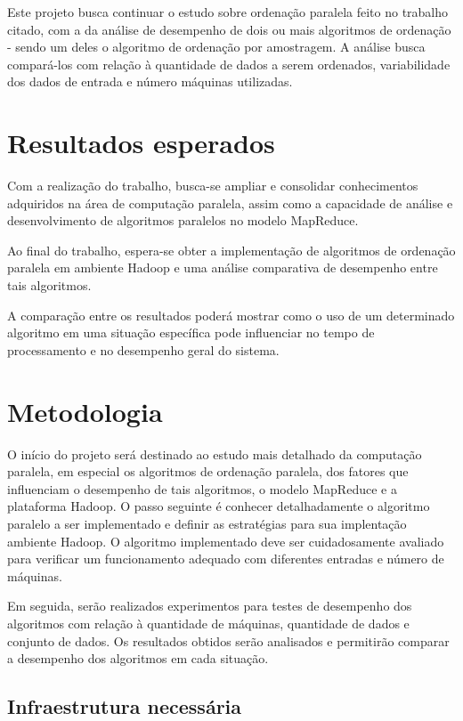 Este projeto busca continuar o estudo sobre ordenação paralela feito no trabalho citado, com a da análise de desempenho de dois ou mais algoritmos de ordenação - sendo um deles o algoritmo de ordenação por amostragem. A análise busca compará-los com relação à quantidade de dados a serem ordenados, variabilidade dos dados de entrada e número máquinas utilizadas. 

\chapter{Resultados esperados}

Com a realização do trabalho, busca-se ampliar e consolidar conhecimentos adquiridos na área de computação paralela, assim como
a capacidade de análise e desenvolvimento de algoritmos paralelos no modelo MapReduce. 


Ao final do trabalho, espera-se obter a implementação de algoritmos de ordenação paralela em ambiente Hadoop e uma análise comparativa de desempenho entre tais algoritmos.

A comparação entre os resultados poderá mostrar como o uso de um determinado algoritmo em uma situação específica pode influenciar no tempo de processamento e no desempenho geral do sistema.

\chapter{Metodologia}

O início do projeto será destinado ao estudo mais detalhado da computação paralela, em especial os algoritmos de ordenação paralela, dos fatores que influenciam o desempenho de tais algoritmos, o modelo MapReduce e a plataforma Hadoop. O passo seguinte é conhecer detalhadamente o algoritmo paralelo a ser implementado e definir as estratégias para sua implentação ambiente Hadoop. 
O algoritmo implementado deve ser cuidadosamente avaliado para verificar um funcionamento adequado com diferentes entradas e número de máquinas. 

Em seguida, serão realizados experimentos para testes de desempenho dos algoritmos com relação à quantidade de máquinas, quantidade de dados e conjunto de dados.  Os resultados obtidos serão analisados e permitirão comparar a desempenho dos algoritmos em cada situação. 


\section{Infraestrutura necessária}

